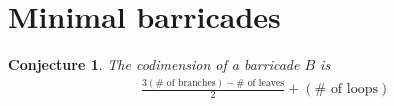 \documentclass{amsart}
\newtheorem{conj}[proposition]{Conjecture}
\theoremstyle{definition}
\theoremstyle{remark}
\numberwithin{equation}{section}
\newcommand{\0}{{\mathbf{0}}}
\renewcommand{\S}{\mathbf{S}}
\begin{document}
\section{Minimal barricades}

\begin{conj}
The codimension of a barricade $B$ is 
\begin{align*}
&\frac{3(\text{$\#$ of branches}) - \text{$\#$ of leaves}}{2} + (\text{$\#$ of loops})
\end{align*}
\end{conj}
\end{document}
